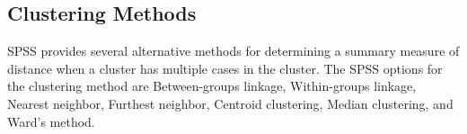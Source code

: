 \documentclass[a4paper,12pt]{article}
\begin{document}
%
%
%
%
%

\newpage
\subsection*{Clustering Methods}

SPSS provides several alternative methods for determining a summary measure of distance when a cluster has multiple cases in the cluster.  The SPSS options for the clustering method are Between-groups linkage, Within-groups linkage, Nearest neighbor, Furthest neighbor, Centroid clustering, Median clustering, and Ward's method.
\end{document}
